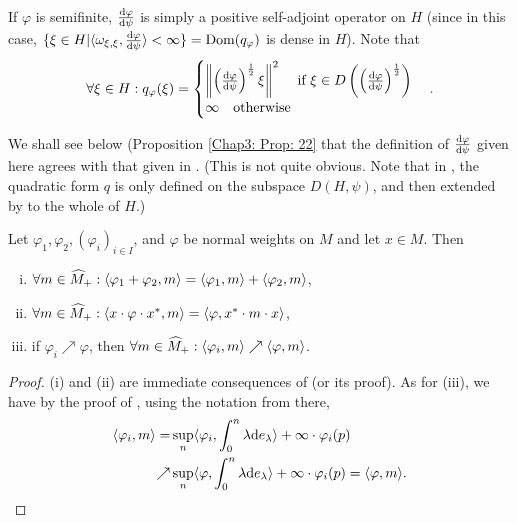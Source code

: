 \begin{remark}
    If $\varphi$ is semifinite, $\dv{\varphi}{\psi}$ is simply a positive self-adjoint operator on $H$ (since in this case, $\{\xi\in H|\langle\omega_{\xi,\xi},\dv{\varphi}{\psi}\rangle<\infty\}=\operatorname{Dom}(q_\varphi)$ is dense in $H$). Note that
    \begin{equation}\label{Chap3: Eqn: 10}
        \forall \xi\in H:q_\varphi(\xi)=\begin{cases}
            \norm{\left( \dv{\varphi}{\psi} \right)^\frac{1}{2}\xi}^2\quad \text{ if } \xi\in D\left( \left( \dv{\varphi}{\psi} \right)^\frac{1}{2} \right) \\
            \infty\quad \text{otherwise}
        \end{cases}.
    \end{equation}
\end{remark}
We shall see below (Proposition \ref{Chap3: Prop: 22} that the definition of $\dv{\varphi}{\psi}$ given here agrees with that given in \cite{1}. (This is not quite obvious. Note that in \cite[Lemma 6]{1}, the quadratic form $q$ is only defined on the subspace $D(H,\psi)$, and then extended by \cite[Lemma 5]{1} to the whole of $H$.)
\begin{lemma}\label{Chap3: Lemma: 13}
    Let $\varphi_1,\varphi_2,(\varphi_i)_{i\in I}$, and $\varphi$ be normal weights on $M$ and let $x\in M$. Then
    \begin{enumerate}[(i)]
        \item $\forall m\in \widehat{M}_+: \langle\varphi_1+\varphi_2,m\rangle=\langle\varphi_1,m\rangle+\langle\varphi_2,m\rangle$,
        \item $\forall m\in \widehat{M}_+: \langle x\cdot\varphi\cdot x^*,m\rangle=\langle\varphi,x^*\cdot m\cdot x\rangle$,
        \item if $\varphi_i\nearrow \varphi$, then $\forall m\in \widehat{M}_+:\langle\varphi_i,m\rangle\nearrow \langle\varphi,m\rangle$.
    \end{enumerate}
\end{lemma}
\begin{proof}
    (i) and (ii) are immediate consequences of \cite[Proposition 1.10]{7} (or its proof). As for (iii), we have by the proof of \cite[Proposition 1.10]{7}, using the notation from there,
    \[
        \begin{split}
            \langle\varphi_i,m\rangle=&\sup_n\langle\varphi_i,\int_0^n \lambda\dd e_\lambda\rangle+\infty\cdot\varphi_i(p)\\
            \nearrow&\sup_n\langle\varphi,\int_0^n\lambda\dd e_\lambda\rangle+\infty\cdot\varphi_i(p)=\langle\varphi,m\rangle.
        \end{split}
    \]
\end{proof}
